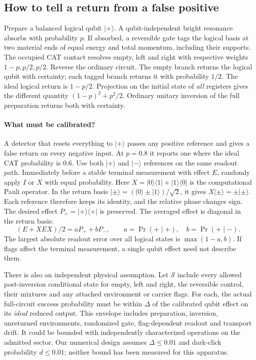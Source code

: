 \subsection{How to tell a return from a false positive}\label{sec:echo3}
Prepare a balanced logical qubit \(|+\rangle\). A qubit-independent bright resonance absorbs with probability \(p\). If absorbed, a reversible gate tags the logical basis at two material ends of equal energy and total momentum, including their supports. The occupied CAT contact resolves empty, left and right with respective weights \(1-p,p/2,p/2\). Reverse the ordinary circuit. The empty branch returns the logical qubit with certainty; each tagged branch returns it with probability \(1/2\). The ideal logical return is \(1-p/2\). Projection on the initial state of \emph{all} registers gives the different quantity \((1-p)^2+p^2/2\). Ordinary unitary inversion of the full preparation returns both with certainty.

\paragraph{What must be calibrated?}
A detector that resets everything to \(|+\rangle\) passes any positive reference and gives a false return on every negative input. At \(p=0.8\) it reports one where the ideal CAT probability is \(0.6\). Use both \(|+\rangle\) and \(|-\rangle\) references on the same readout path. Immediately before a stable terminal measurement with effect \(E\), randomly apply \(I\) or \(X\) with equal probability. Here \(X=|0\rangle\langle1|+|1\rangle\langle0|\) is the computational Pauli operator. In the return basis \(|\pm\rangle=(|0\rangle\pm|1\rangle)/\sqrt2\), it gives \(X|\pm\rangle=\pm|\pm\rangle\). Each reference therefore keeps its identity, and the relative phase changes sign. The desired effect \(P_+=|+\rangle\langle+|\) is preserved. The averaged effect is diagonal in the return basis:
\[
 (E+XEX)/2=aP_++bP_-,\qquad
 a=\Pr(+\mid +),\quad b=\Pr(+\mid -).
\]
The largest absolute readout error over all logical states is \(\max(1-a,b)\). If flags affect the terminal measurement, a single qubit effect need not describe them.

There is also an independent physical assumption. Let \(\mathcal S\) include every allowed post-inversion conditional state for empty, left and right, the reversible control, their mixtures and any attached environment or carrier flags. For each, the actual full-circuit success probability must be within \(\Delta\) of the calibrated qubit effect on its \emph{ideal} reduced output. This envelope includes preparation, inversion, unreturned environments, randomized gate, flag-dependent readout and transport drift. It could be bounded with independently characterized operations on the admitted sector. Our numerical design assumes \(\Delta\le0.01\) and dark-click probability \(d\le0.01\); neither bound has been measured for this apparatus.

